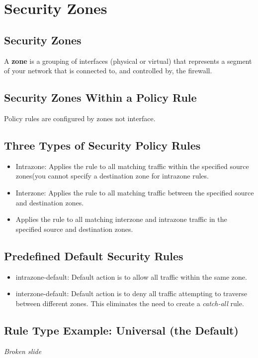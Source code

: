 \section{Security Zones}
\subsection{Security Zones}
A \textbf{zone} is a grouping of interfaces (physical or virtual) that represents a segment of your network that is connected to, and controlled by, the firewall.

\subsection{Security Zones Within a Policy Rule}
Policy rules are configured by zones not interface.

\subsection{Three Types of Security Policy Rules}
    \begin{itemize}
        \item Intrazone:  Applies the rule to all matching traffic within the specified source zones(you cannot specify a destination zone for intrazone rules.
        \item Interzone:  Applies the rule to all matching traffic between the specified source and destination zones.
        \item Applies the rule to all matching interzone and intrazone traffic in the specified source and destination zones.
    \end{itemize}

\subsection{Predefined Default Security Rules}
    \begin{itemize}
        \item intrazone-default:  Default action is to allow all traffic within the same zone.
        \item interzone-default:  Default action is to deny all traffic attempting to traverse between different zones. This eliminates the need to create a \textit{catch-all} rule.
    \end{itemize}

\subsection{Rule Type Example:  Universal (the Default)}
\textit{Broken slide}

